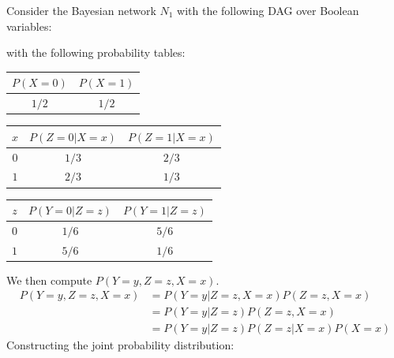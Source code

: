 \documentclass{article}
\begin{document}
\clearpage
\problem{}
Consider the Bayesian network $N_1$ with the following DAG over Boolean variables:
\begin{center}
\end{center}
with the following probability tables:
\begin{center}
\begin{tabular}{|c|c|}
    \hline
    $P(X = 0)$ & $P(X = 1)$ \\
    \hline
    $1/2$ & $1/2$ \\
    \hline
\end{tabular}
\end{center}
\begin{center}
\begin{tabular}{|c|c|c|}
    \hline
    $x$ & $P(Z = 0 | X = x)$ & $P(Z = 1 | X = x)$ \\
    \hline
    $0$ & $1/3$ & $2/3$ \\
    \hline
    $1$ & $2/3$ & $1/3$ \\
    \hline
\end{tabular}
\end{center}
\begin{center}
\begin{tabular}{|c|c|c|}
    \hline
    $z$ & $P(Y = 0 | Z = z)$ & $P(Y = 1 | Z = z)$ \\
    \hline
    $0$ & $1/6$ & $5/6$ \\
    \hline
    $1$ & $5/6$ & $1/6$ \\
    \hline
\end{tabular}
\end{center}
We then compute $P(Y = y, Z = z, X = x)$.
\begin{align*}
    P(Y = y, Z = z, X = x) & = P(Y = y|Z = z, X = x)P(Z = z, X = x) \\
    & = P(Y = y|Z = z)P(Z = z, X = x) \\
    & = P(Y = y|Z = z)P(Z = z | X = x)P(X = x)
\end{align*}
Constructing the joint probability distribution:
\end{document}
